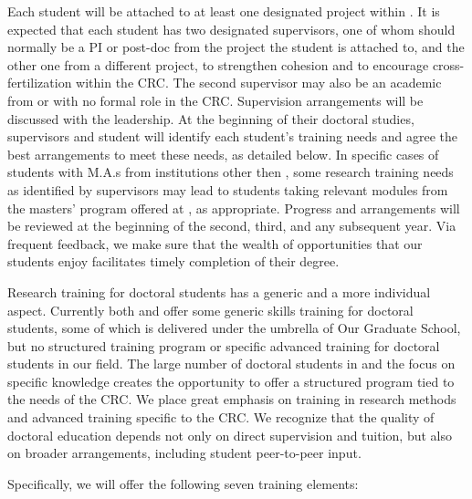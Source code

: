 Each student will be attached to at least one designated project within \thiscrc. It is expected that each student has two designated supervisors, one of whom should normally be a PI or post-doc from the project the student is attached to, and the other one from a different project, to strengthen  cohesion and to encourage cross-fertilization within the CRC. The second supervisor may also be an academic from \ABRA{} or \ABRB{} with no formal role in the CRC. Supervision arrangements will be discussed with the  leadership. At the beginning of their doctoral studies, supervisors and student will identify each student’s training needs and agree the best arrangements to meet these needs, as detailed below. In specific cases of students with M.A.s from institutions other then \ABRA{}, some research training needs as identified by supervisors may lead to students taking relevant modules from the masters’ program offered at \ABRA{}, as appropriate. Progress and arrangements will be reviewed at the beginning of the second, third, and any subsequent year. Via frequent feedback, we make sure that the wealth of opportunities that our students enjoy facilitates timely completion of their degree.



Research training for doctoral students has a generic and a more individual aspect. Currently both \ABRA{} and \ABRB{} offer some generic skills training for doctoral students, some of which is delivered under the umbrella of Our Graduate School, but  no structured training program or specific advanced training for doctoral students in our field.  The large number of doctoral students in \thiscrc{} and the focus on specific knowledge creates the opportunity to offer a structured program tied to the needs of the CRC. We place great emphasis on training in research methods and advanced training specific to the CRC. We recognize that the quality of doctoral education depends not only on direct supervision and tuition, but also on broader arrangements, including student peer-to-peer input.

Specifically, we will offer the following seven training elements:

%

